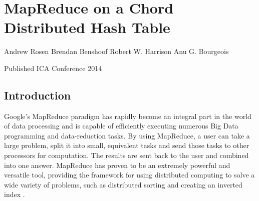 
\chapter{MapReduce on a Chord Distributed Hash Table}

\begin{center}
Andrew Rosen \qquad Brendan Benshoof  \qquad Robert W. Harrison \qquad Anu G. Bourgeois

Published ICA Conference 2014
\end{center}


\section{Introduction}




Google's MapReduce \cite{mapreduce} paradigm has rapidly become an integral part in the world of data processing and is capable of efficiently executing numerous Big Data programming and data-reduction tasks.  By using MapReduce, a user can take a large problem, split it into small, equivalent tasks and send those tasks to other processors for computation.  The results are sent back to the user and combined into one answer.  MapReduce has proven to be an extremely powerful and versatile tool, providing the framework for using distributed computing to solve a wide variety of problems, such as distributed sorting and creating an inverted index \cite{mapreduce}. 



